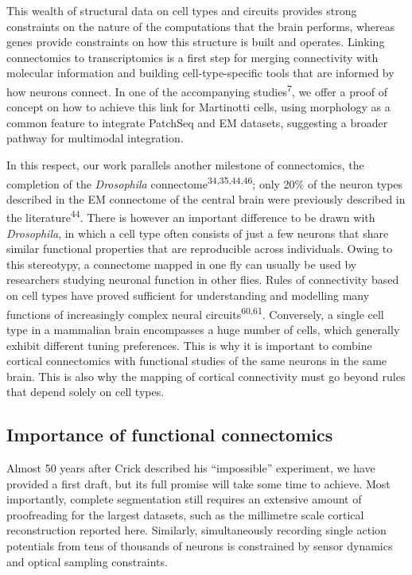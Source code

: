 \documentclass{article}
\begin{document}
This wealth of structural data on cell types and circuits provides strong constraints on the nature of the computations that the brain performs, whereas genes provide constraints on how this structure is built and operates. Linking connectomics to transcriptomics is a first step for merging connectivity with molecular information and building cell-type-specific tools that are informed by how neurons connect. In one of the accompanying studies\textsuperscript{7}, we offer a proof of concept on how to achieve this link for Martinotti cells, using morphology as a common feature to integrate PatchSeq and EM datasets, suggesting a broader pathway for multimodal integration.

In this respect, our work parallels another milestone of connectomics, the completion of the \emph{Drosophila} connectome\textsuperscript{34,35,44,46}; only 20\% of the neuron types described in the EM connectome of the central brain were previously described in the literature\textsuperscript{44}. There is however an important difference to be drawn with \emph{Drosophila}, in which a cell type often consists of just a few neurons that share similar functional properties that are reproducible across individuals. Owing to this stereotypy, a connectome mapped in one fly can usually be used by researchers studying neuronal function in other flies. Rules of connectivity based on cell types have proved sufficient for understanding and modelling many functions of increasingly complex neural circuits\textsuperscript{60,61}. Conversely, a single cell type in a mammalian brain encompasses a huge number of cells, which generally exhibit different tuning preferences. This is why it is important to combine cortical connectomics with functional studies of the same neurons in the same brain. This is also why the mapping of cortical connectivity must go beyond rules that depend solely on cell types.

\subsection*{Importance of functional connectomics}

Almost 50 years after Crick described his “impossible” experiment, we have provided a first draft, but its full promise will take some time to achieve. Most importantly, complete segmentation still requires an extensive amount of proofreading for the largest datasets, such as the millimetre scale cortical reconstruction reported here. Similarly, simultaneously recording single action potentials from tens of thousands of neurons is constrained by sensor dynamics and optical sampling constraints.
\end{document}
